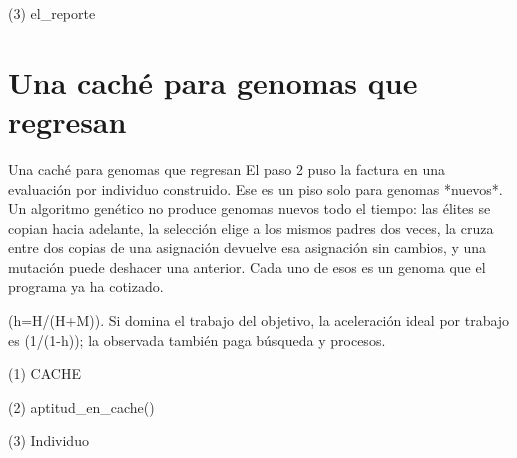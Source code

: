 \begin{frame}[fragile]{(3) el\_reporte}

\end{frame}


\section{Una caché para genomas que regresan}

\begin{frame}{Una caché para genomas que regresan}
El paso 2 puso la factura en una evaluación por individuo construido. Ese es un piso
solo para genomas *nuevos*. Un algoritmo genético no produce genomas nuevos todo
el tiempo: las élites se copian hacia adelante, la selección elige a los mismos padres dos veces,
la cruza entre dos copias de una asignación devuelve esa asignación sin cambios, y
una mutación puede deshacer una anterior. Cada uno de esos es un genoma que el programa
ya ha cotizado.

(h=H/(H+M)). Si domina el trabajo del objetivo, la aceleración ideal por
trabajo es (1/(1-h)); la observada también paga búsqueda y procesos.
\end{frame}

\begin{frame}[fragile]{(1) CACHE}

\end{frame}

\begin{frame}[fragile]{(2) aptitud\_en\_cache()}

\end{frame}

\begin{frame}[fragile]{(3) Individuo}

\end{frame}

